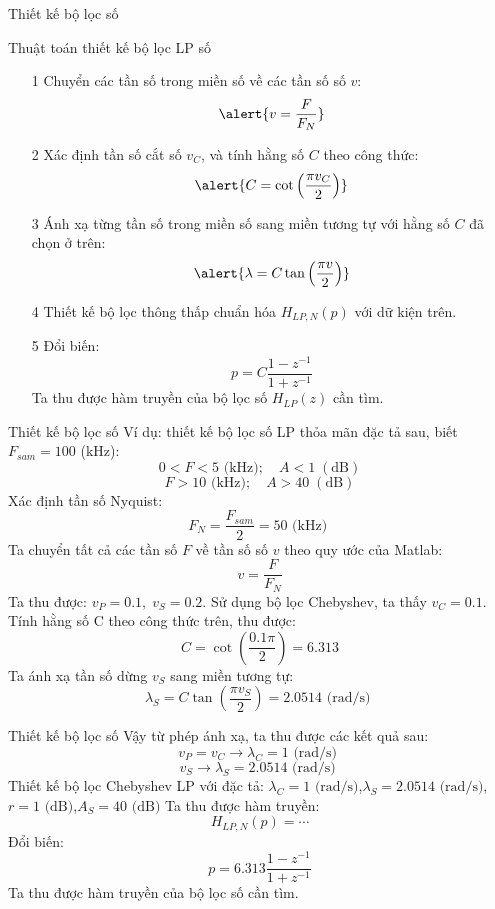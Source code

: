 \documentclass[8pt]{beamer}
\begin{document}
\begin{frame}{Thiết kế bộ lọc số}
	\begin{block}{Thuật toán thiết kế bộ lọc LP số}
	\begin{enumerate}
	\item[1] Chuyển các tần số trong miền số về các tần số số $v$:
		$$\alert{v=\frac{F}{F_{N}}}$$
	\item[2] Xác định tần số cắt số $v_{C}$, và tính hằng số $C$ theo công thức:
$$\alert{C=\cot{\left(\frac{\pi v_{C}}{2}\right)}}$$
\item[3] Ánh xạ từng tần số trong miền số sang miền tương tự với hằng số $C$ đã chọn ở trên:
	$$\alert{\lambda=C\tan{\left(\frac{\pi v}{2}\right)}}$$
\item[4] Thiết kế bộ lọc thông thấp chuẩn hóa $H_{LP,N}(p)$ với dữ kiện trên.
\item[5] Đổi biến:
	$$p=C\frac{1-z^{-1}}{1+z^{-1}}$$
	 Ta thu được hàm truyền của bộ lọc số $H_{LP}(z)$ cần tìm.
	\end{enumerate}
	\end{block}
\end{frame}
\begin{frame}{Thiết kế bộ lọc số}
Ví dụ: thiết kế bộ lọc số LP thỏa mãn đặc tả sau, biết $F_{sam}=100$ (kHz):
$$0<F<5\text{ (kHz)};\quad A<1\;(\text{dB})$$
$$F>10\text{ (kHz)};\quad A>40\;(\text{dB})$$
Xác định tần số Nyquist: $$F_{N}=\frac{F_{sam}}{2}=50\text{ (kHz) }$$
Ta chuyển tất cả các tần số $F$ về tần số số $v$ theo quy ước của Matlab:
$$v=\frac{F}{F_{N}}$$
Ta thu được: $v_{P}=0.1,\;v_{S}=0.2$. Sử dụng bộ lọc Chebyshev, ta thấy $v_{C}=0.1$. \\Tính hằng số C theo công thức trên, thu được:
$$C=\cot{\left(\frac{0.1\pi}{2}\right)}=6.313$$
Ta ánh xạ tần số dừng $v_{S}$ sang miền tương tự:
$$\lambda_{S}=C\tan{\left(\frac{\pi v_{S}}{2}\right)}=2.0514\text{ (rad/s) }$$
\end{frame}
\begin{frame}{Thiết kế bộ lọc số}
Vậy từ phép ánh xạ, ta thu được các kết quả sau:
$$v_{P}=v_{C}\to\lambda_{C}=1\text{ (rad/s) }$$
$$v_{S}\to\lambda_{S}=2.0514\text{ (rad/s) }$$
Thiết kế bộ lọc Chebyshev LP với đặc tả: $\lambda_{C}=1\text{ (rad/s)}$,\;$\lambda_{S}=2.0514\text{ (rad/s)}$,\;$r=1\text{ (dB)}$,\;$A_{S}=40\text{ (dB)}$
Ta thu được hàm truyền:
$$H_{LP,N}(p)=\cdots$$
Đổi biến: $$p=6.313\frac{1-z^{-1}}{1+z^{-1}}$$
Ta thu được hàm truyền của bộ lọc số cần tìm.
\end{frame}
\end{document}
